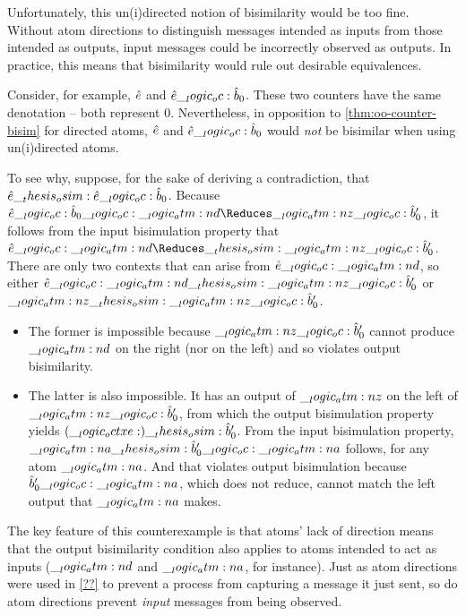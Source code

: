 Unfortunately, this un(i)directed notion of bisimilarity would be too fine.
Without atom directions to distinguish messages intended as inputs from those intended as outputs, input messages could be incorrectly observed as outputs.
In practice, this means that bisimilarity would rule out desirable equivalences.

Consider, for example, $\hat{e}$ and $\hat{e} \__logic_oc: \hat{b}_0$.
These two counters have the same denotation -- both represent $0$.
Nevertheless, in opposition to \cref{thm:oo-counter-bisim} for directed atoms, $\hat{e}$ and $\hat{e} \__logic_oc: \hat{b}_0$ would \emph{not} be bisimilar when using un(i)directed atoms.

To see why, suppose, for the sake of deriving a contradiction, that $\hat{e} \__thesis_osim: \hat{e} \__logic_oc: \hat{b}_0$.
Because $\defp{e} \oc \defp{b}_0 \oc \atm{d} \Reduces \atm{z} \oc \defp{b}'_0$, it follows from the input bisimulation property that $\defp{e} \oc \atm{d} \Reduces\osim \atm{z} \oc \defp{b}'_0$.
There are only two contexts that can arise from $\hat{e} \__logic_oc: \__logic_atm:n {d}$, so either $\hat{e} \__logic_oc: \__logic_atm:n {d} \__thesis_osim: \__logic_atm:n {z} \__logic_oc: \hat{b}'_0$ or $\__logic_atm:n {z} \__thesis_osim: \__logic_atm:n {z} \__logic_oc: \hat{b}'_0$.
\begin{itemize}
\item The former is impossible because $\__logic_atm:n {z} \__logic_oc: \hat{b}'_0$ cannot produce $\__logic_atm:n {d}$ on the right (nor on the left) and so violates output bisimilarity.

\item The latter is also impossible.
It has an output of $\__logic_atm:n {z}$ on the left of $\__logic_atm:n {z} \__logic_oc: \hat{b}'_0$, from which the output bisimulation property yields $(\__logic_octxe:) \__thesis_osim: \hat{b}'_0$.
From the input bisimulation property, $\__logic_atm:n {a} \__thesis_osim: \hat{b}'_0 \__logic_oc: \__logic_atm:n {a}$ follows, for any atom $\__logic_atm:n {a}$.
And that violates output bisimulation because $\hat{b}'_0 \__logic_oc: \__logic_atm:n {a}$, which does not reduce, cannot match the left output that $\__logic_atm:n {a}$ makes.
\end{itemize}

The key feature of this counterexample is that atoms' lack of direction means that the output bisimilarity condition also applies to atoms intended to act as inputs ($\__logic_atm:n {d}$ and $\__logic_atm:n {a}$, for instance).
Just as atom directions were used in \cref{??} to prevent a process from capturing a message it just sent, so do atom directions prevent \emph{input} messages from being observed.



